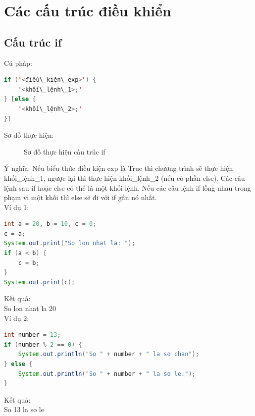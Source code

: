 \section{Các cấu trúc điều khiển}
\subsection{Cấu trúc if}
\indent Cú pháp:\\
\begin{lstlisting}[escapechar=',language=java]	
if ('<điều\_kiện\_exp>') {
	'<khối\_lệnh\_1>;'
} [else {
	'<khối\_lệnh\_2>;'
}]
\end{lstlisting}

\indent Sơ đồ thực hiện:
\begin{figure}[!ht]
\centering

\caption{Sơ đồ thực hiện cấu trúc if}\label{hinh13} 
\end{figure}

\indent Ý nghĩa: Nếu biểu thức điều kiện exp là True thì chương trình sẽ thực hiện {\ttfamily khối\_lệnh\_1}, ngược lại thì thực hiện {\ttfamily khối\_lệnh\_2} (nếu có phần else). Các câu lệnh sau if hoặc else có thể là một khối lệnh. Nếu các câu lệnh if lồng nhau trong phạm vi một khối thì else sẽ đi với if gần nó nhất.\\
\indent Ví dụ 1:
\begin{lstlisting}[escapechar=!,language=java]	
int a = 20, b = 10, c = 0;
c = a;
System.out.print("So lon nhat la: ");
if (a < b) {
	c = b;
}
System.out.print(c);
\end{lstlisting}

\indent Kết quả:\\
{\ttfamily So lon nhat la 20}\\

\indent Ví dụ 2:
\begin{lstlisting}[escapechar=!,language=java]	
int number = 13;
if (number % 2 == 0) {
	System.out.println("So " + number + " la so chan");
} else {
	System.out.println("So " + number + " la so le.");
}
\end{lstlisting}

\indent Kết quả:\\
{\ttfamily So 13 la so le}
